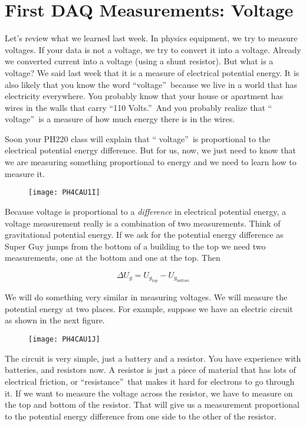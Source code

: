\chapter{First DAQ Measurements: Voltage}
Let's review what we learned last week. In physics equipment, we try to
measure voltages. If your data is not a voltage, we try to convert it into a
voltage. Already we converted current into a voltage (using a shunt
resistor). But what is a voltage? We said last week that it is a measure of
electrical potential energy. It is also likely that you know the word
\textquotedblleft voltage\textquotedblright\ because we live in a world that
has electricity everywhere. You probably know that your house or apartment
has wires in the walls that carry \textquotedblleft 110
Volts.\textquotedblright\ And you probably realize that \textquotedblleft
voltage\textquotedblright\ is a measure of how much energy there is in the
wires.

Soon your PH220 class will explain that \textquotedblleft
voltage\textquotedblright\ is proportional to the electrical potential
energy difference. But for us, now, we just need to know that we are
measuring something proportional to energy and we need to learn how to
measure it.

\begin{figure}[h!]
	\centering
	\texttt{[image: PH4CAU1I]}
\end{figure}

Because voltage is proportional to a \emph{difference} in electrical
potential energy, a voltage measurement really is a combination of two
measurements. Think of gravitational potential energy. If we ask for the
potential energy difference as Super Guy jumps from the bottom of a building
to the top we need two measurements, one at the bottom and one at the top. Then 

\begin{equation*}
	\Delta U_{g}=U_{g_{top}}-U_{g_{bottom}}
\end{equation*}

We will do something very similar in measuring voltages. We will measure the
potential energy at two places. For example, suppose we have an electric
circuit as shown in the next figure. 
\begin{figure}[h!]
	\centering	
    \texttt{[image: PH4CAU1J]}
\end{figure}
The circuit is very simple, just a battery and a resistor. You have experience with batteries, and resistors now. A resistor is just a piece of material that has lots of electrical friction, or \textquotedblleft resistance\textquotedblright\ that makes it
hard for electrons to go through it. If we want to measure the voltage across the resistor, we have to measure on the top and bottom of the resistor. That will give us a measurement proportional to the potential energy difference from one side to the other of the resistor.

